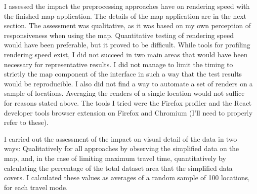 I assessed the impact the preprocessing approaches have on rendering speed
with the finished map application.
The details of the map application are in the next section.
The assessment was qualitative,
as it was based on my own perception of responsiveness when using the map.
Quantitative testing of rendering speed would have been preferable,
but it proved to be difficult.
While tools for profiling rendering speed exist,
I did not succeed in two main areas
that would have been necessary for representative results.
I did not manage to limit the timing to strictly the map
component of the interface in such a way that
the test results would be reproducible.
I also did not find a way to automate a set of renders
on a sample of locations.
Averaging the renders of a single location would not suffice
for reasons stated above.
The tools I tried were the Firefox profiler
and the React developer tools browser extension on Firefox and Chromium
(I'll need to properly refer to these).

I carried out the assessment of the impact on visual detail of the data in two ways:
Qualitatively for all approaches by observing the simplified data on the map,
and, in the case of limiting maximum travel time,
quantitatively by calculating the percentage of the total dataset area that the simplified data covers.
I calculated these values as averages of a random sample of 100 locations, for each travel mode.


